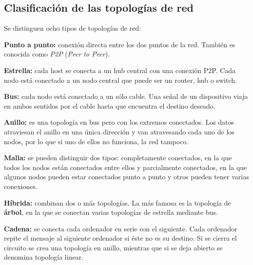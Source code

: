 \documentclass[a4paper, 11pt, twoside]{report} %
\begin{document}
\subsection{Clasificación de las topologías de red}
Se distinguen ocho tipos de topologías de red: \cite{bicsi-02}
\begin{description}
\item \textbf{Punto a punto:} conexión directa entre los dos puntos de la red. También es conocida como \textit{P2P} (\textit{Peer to Peer}).
\item \textbf{Estrella:} cada host se conecta a un hub central con una conexión P2P. Cada nodo está conectado a un nodo central que puede ser un router, hub o switch.
\item \textbf{Bus:} cada nodo está conectado a un sólo cable. Una señal de un dispositivo viaja en ambos sentidos por el cable hasta que encuentra el destino deseado.
\item \textbf{Anillo:} es una topología en bus pero con los extremos conectados. Los datos atraviesan el anillo en una única dirección y van atravesando cada uno de los nodos, por lo que si uno de ellos no funciona, la red tampoco.
\item \textbf{Malla:} se pueden distinguir dos tipos: completamente conectados, en la que todos los nodos están conectados entre ellos y parcialmente conectados, en la que algunos nodos pueden estar conectados punto a punto y otros pueden tener varias conexiones.
\item \textbf{Híbrida:} combinan dos o más topologías. La más famosa es la topología de \textbf{árbol}, en la que se conectan varias topologías de estrella mediante bus. 
\item \textbf{Cadena:} se conecta cada ordenador en serie con el siguiente. Cada ordenador repite el mensaje al siguiente ordenador si éste no es su destino. Si se cierra el circuito se crea una topología en anillo, mientras que si se deja abierto se denomina topología linear.
\end{description}
\end{document}
